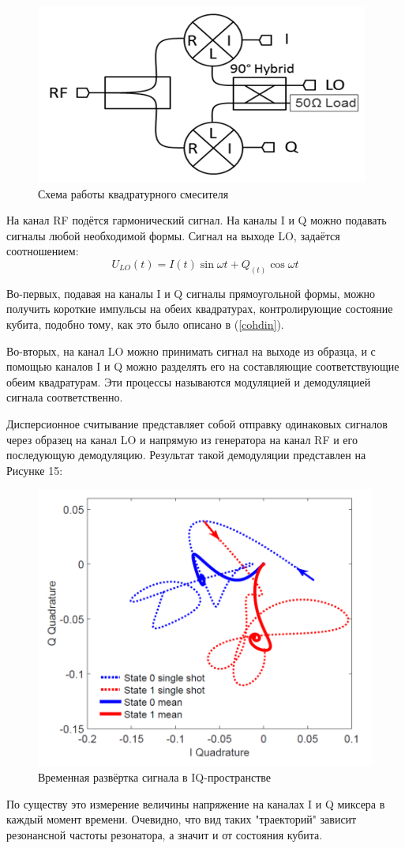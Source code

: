 \begin{figure}[h]
	\centering
	\includegraphics[width=0.5\linewidth]{pictures/IQ-mixer}
	\caption{Схема работы квадратурного смесителя}
	\label{fig:iq-mixer}
\end{figure}
На канал RF подётся гармонический сигнал. На каналы I и Q можно подавать сигналы любой необходимой формы. Сигнал на выходе LO, задаётся соотношением:
\begin{equation}
\tag{40}
U_{LO}(t) = I(t)\sin{\omega t}+ Q_(t)\cos{\omega t}
\end{equation}

Во-первых, подавая на каналы I и Q сигналы прямоугольной формы, можно получить короткие импульсы на обеих квадратурах, контролирующие состояние кубита, подобно тому, как это было описано в (\ref{cohdin}). 

Во-вторых, на канал LO можно принимать сигнал на выходе из образца, и с помощью каналов I и Q можно разделять его на составляющие соответствующие обеим квадратурам. Эти процессы называются модуляцией и демодуляцией сигнала соответственно.

Дисперсионное считывание представляет собой отправку одинаковых сигналов через образец на канал LO и напрямую из генератора на канал RF и его последующую демодуляцию. Результат такой демодуляции представлен на Рисунке 15:

\begin{figure}[!h]
	\centering
	\includegraphics[width=0.5\linewidth]{pictures/readout}
	\caption{Временная развёртка сигнала в IQ-пространстве \cite{Magesan2015} }
	\label{fig:readout}
\end{figure}

По существу это измерение величины напряжение на каналах I и Q миксера в каждый момент времени. Очевидно, что вид таких "траекторий"  зависит резонансной частоты резонатора, а значит и от состояния кубита. 
   